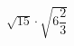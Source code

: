 \begin{ex}[type=calculate]
	\begin{condition}
		\( \sqrt{15}\cdot\sqrt{6\dfrac{2}{3}} \)
	\end{condition}
\end{ex}